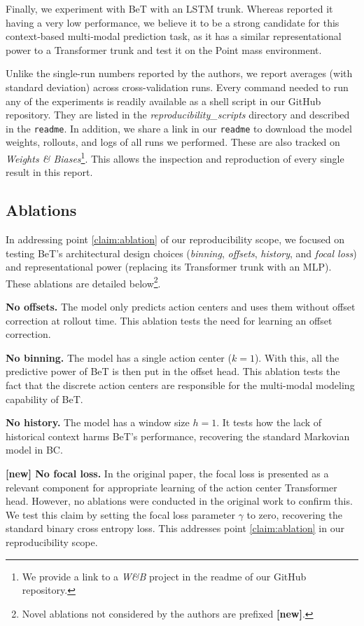 Finally, we experiment with BeT with an LSTM trunk.
Whereas \citet{shafiullah2022behavior} reported it having a very low performance, we believe it to be a strong candidate for this context‐based multi‐modal prediction task, as it has a similar representational power to a Transformer trunk and test it on the Point mass environment.

Unlike the single-run numbers reported by the authors, we report averages (with standard deviation) across cross-validation runs.
Every command needed to run any of the experiments is readily available as a shell script in our GitHub repository.
They are listed in the \emph{reproducibility\_scripts} directory and described in the \texttt{readme}.
In addition, we share a link in our \texttt{readme} to download the model weights, rollouts, and logs of all runs we performed.
These are also tracked on \textit{Weights \& Biases}\footnote{We provide a link to a \emph{W\&B} project in the readme of our GitHub repository.}\cite{wandb}.
This allows the inspection and reproduction of every single result in this report.

\subsection{Ablations}\label{section:bet_ablations}
In addressing point \ref{claim:ablation} of our reproducibility scope, we focused on testing BeT's architectural design choices (\emph{binning}, \emph{offsets}, \emph{history}, and \emph{focal loss}) and representational power (replacing its Transformer trunk with an MLP). These ablations are detailed below\footnote{Novel ablations not considered by the authors are prefixed \textbf{[new]}.}.

\textbf{No offsets.} The model only predicts action centers and uses them without offset correction at rollout time.
This ablation tests the need for learning an offset correction.

\textbf{No binning.} The model has a single action center ($k=1$).
With this, all the predictive power of BeT is then put in the offset head. This ablation tests the fact that the discrete action centers are responsible for the multi-modal modeling capability of BeT.

\textbf{No history.} The model has a window size $h=1$.
It tests how the lack of historical context harms BeT's performance, recovering the standard Markovian model in BC.

\textbf{[new] No focal loss.} In the original paper, the focal loss is presented as a relevant component for appropriate learning of the action center Transformer head.
However, no ablations were conducted in the original work to confirm this.
We test this claim by setting the focal loss parameter $\gamma$ to zero, recovering the standard binary cross entropy loss.
This addresses point \ref{claim:ablation} in our reproducibility scope.

